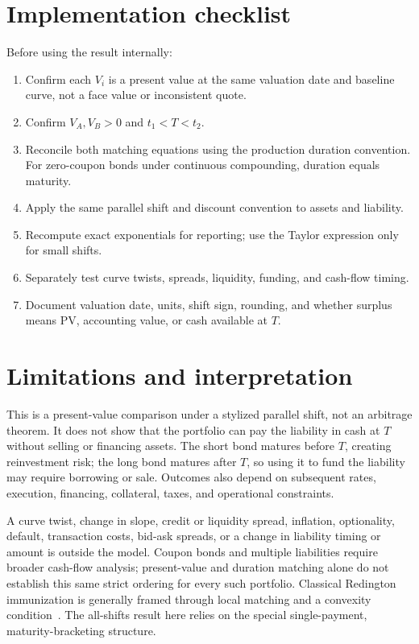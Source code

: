 \documentclass[11pt]{article}
\begin{document}
\section{Implementation checklist}
Before using the result internally:
\begin{enumerate}[label=\arabic*.]
 \item Confirm each \(V_i\) is a present value at the same valuation date and baseline curve, not a face value or inconsistent quote.
 \item Confirm \(V_A,V_B>0\) and \(t_1<T<t_2\).
 \item Reconcile both matching equations using the production duration convention. For zero-coupon bonds under continuous compounding, duration equals maturity.
 \item Apply the same parallel shift and discount convention to assets and liability.
 \item Recompute exact exponentials for reporting; use the Taylor expression only for small shifts.
 \item Separately test curve twists, spreads, liquidity, funding, and cash-flow timing.
 \item Document valuation date, units, shift sign, rounding, and whether surplus means PV, accounting value, or cash available at \(T\).
\end{enumerate}

\section{Limitations and interpretation}
This is a present-value comparison under a stylized parallel shift, not an arbitrage theorem. It does not show that the portfolio can pay the liability in cash at \(T\) without selling or financing assets. The short bond matures before \(T\), creating reinvestment risk; the long bond matures after \(T\), so using it to fund the liability may require borrowing or sale. Outcomes also depend on subsequent rates, execution, financing, collateral, taxes, and operational constraints.

A curve twist, change in slope, credit or liquidity spread, inflation, optionality, default, transaction costs, bid-ask spreads, or a change in liability timing or amount is outside the model. Coupon bonds and multiple liabilities require broader cash-flow analysis; present-value and duration matching alone do not establish this same strict ordering for every such portfolio. Classical Redington immunization is generally framed through local matching and a convexity condition~\cite{redington,broverman}. The all-shifts result here relies on the special single-payment, maturity-bracketing structure.
\end{document}
